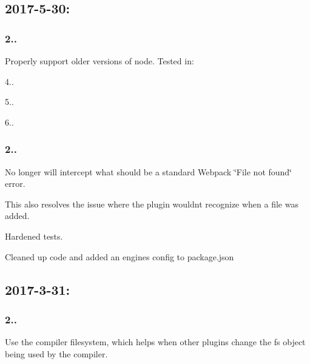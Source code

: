 \subsection*{2017-\/5-\/30\+:}

\subsubsection*{2..}


\begin{DoxyItemize}
\item Properly support older versions of node. Tested in\+:
\begin{DoxyItemize}
\item 4..
\item 5..
\item 6..
\end{DoxyItemize}
\end{DoxyItemize}

\subsubsection*{2..}


\begin{DoxyItemize}
\item No longer will intercept what should be a standard Webpack \char`\"{}\+File not found\char`\"{} error.
\begin{DoxyItemize}
\item This also resolves the issue where the plugin wouldn\textquotesingle{}t recognize when a file was added.
\end{DoxyItemize}
\item Hardened tests.
\item Cleaned up code and added an \textquotesingle{}engines\textquotesingle{} config to package.\+json
\end{DoxyItemize}

\subsection*{2017-\/3-\/31\+:}

\subsubsection*{2..}


\begin{DoxyItemize}
\item Use the compiler filesystem, which helps when other plugins change the \textquotesingle{}fs\textquotesingle{} object being used by the compiler. 
\end{DoxyItemize}